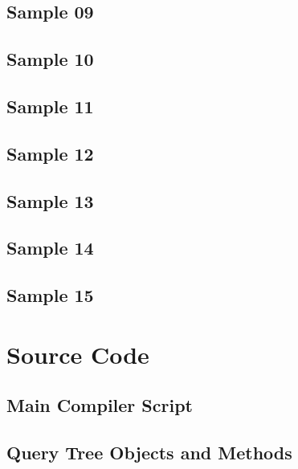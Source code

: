 \documentclass[]{article}
\begin{document}
		\subsection{Sample 09}  \pagebreak
		\subsection{Sample 10}  \pagebreak
		\subsection{Sample 11}  \pagebreak
		\subsection{Sample 12}  \pagebreak
		\subsection{Sample 13}  \pagebreak
		\subsection{Sample 14}  \pagebreak
		\subsection{Sample 15}  \pagebreak
		
	\section{Source Code}
		\subsection{Main Compiler Script} 
		
		\subsection{Query Tree Objects and Methods} 
	
\end{document}
